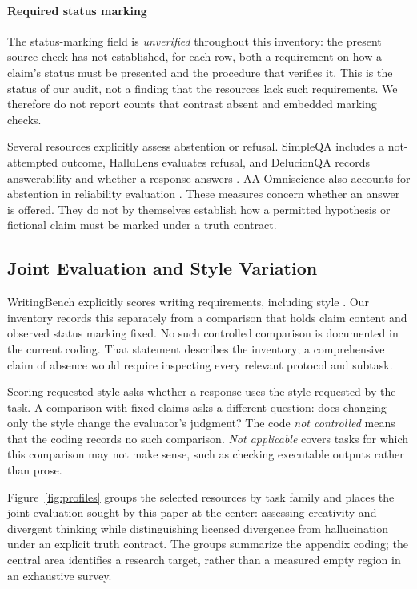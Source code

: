 \documentclass{clv2025}
\begin{document}
\paragraph{Required status marking}
The status-marking field is \emph{unverified} throughout this inventory:
the present source check has not established, for each row, both a
requirement on how a claim's status must be presented and the procedure
that verifies it. This is the status of our audit, not a finding that the
resources lack such requirements. We therefore do not report counts that
contrast absent and embedded marking checks.

Several resources explicitly assess abstention or refusal. SimpleQA
includes a not-attempted outcome, HalluLens evaluates refusal, and
DelucionQA records answerability and whether a response answers
\citep{wei_measuring_2024,bang_hallulens_2025,sadat_delucionqa_2023}.
AA-Omniscience also accounts for abstention in reliability evaluation
\citep{jackson_aaomniscience_2025}. These measures concern whether an answer
is offered. They do not by themselves establish how a permitted hypothesis
or fictional claim must be marked under a truth contract.

\subsection{Joint Evaluation and Style Variation}

WritingBench explicitly scores writing requirements, including style
\citep{wu_writingbench_2025}. Our inventory records this separately from a
comparison that holds claim content and observed status marking fixed.
No such controlled comparison is documented in the current coding. That
statement describes the inventory; a comprehensive claim of absence would
require inspecting every relevant protocol and subtask.

Scoring requested style asks whether a response uses the style requested
by the task. A comparison with fixed claims asks a different question:
does changing only the style change the evaluator's judgment? The code
\emph{not controlled} means that the coding records no such comparison.
\emph{Not applicable} covers tasks for which this comparison may not make
sense, such as checking executable outputs rather than prose.

Figure~\ref{fig:profiles} groups the selected resources by task family and
places the joint evaluation sought by this paper at the center: assessing
creativity and divergent thinking while distinguishing licensed divergence
from hallucination under an explicit truth contract. The groups summarize
the appendix coding; the central area identifies a research target, rather
than a measured empty region in an exhaustive survey.
\end{document}
